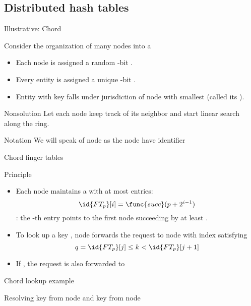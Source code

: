 \subsection{Distributed hash tables}
\begin{slide}{Illustrative: Chord}
  \begin{block}{Consider the organization of many nodes into a }
    \begin{itemize}\tightlist
    \item Each node is assigned a random -bit .
    \item Every entity is assigned a unique -bit .
    \item Entity with key  falls under jurisdiction of node with smallest 
      (called its  ).
    \end{itemize}
  \end{block}
  \begin{alertblock}{Nonsolution}
    Let each node keep track of its neighbor and start linear search along the ring.
  \end{alertblock}
  \begin{block}{Notation}
    We will speak of node  as the node have identifier 
  \end{block}
\end{slide}
\begin{slide}{Chord finger tables}
  \begin{block}{Principle}
    \begin{itemize}
    \item<1-> Each node  maintains a   with at most 
      entries:
      \[
      \id{FT_p}[i] = \func{succ}(p + 2^{i-1})
      \]
      : the -th entry points to the first node succeeding  by at least
      .
    \item<2-> To look up a key , node  forwards the request to node with index 
      satisfying
      \[
      q = \id{FT_p}[j] \leq k < \id{FT_p}[j+1]
      \]
    \item<3-> If , the request is also forwarded to 
    \end{itemize}
  \end{block}
\end{slide}
\begin{slide}{Chord lookup example}
  \begin{block}{Resolving key  from node  and key  from node }
    \begin{center}
    \end{center}
  \end{block}
\end{slide}
